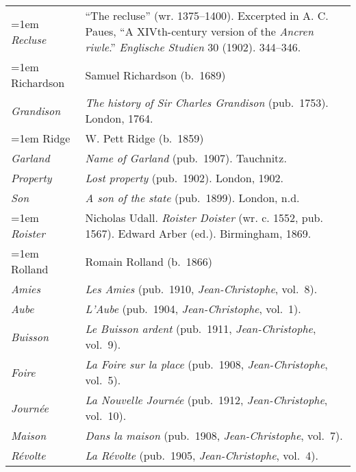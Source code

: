 \begin{xltabular}{\textwidth}{ lQ }
\hangindent=1em  \textit{Recluse} & ``The recluse'' (wr. 1375--1400). Excerpted in A. C. Paues, ``A XIVth-century version of the \textit{Ancren riwle}.'' \textit{Englische Studien} 30 (1902). 344--346. \\ %

\hangindent=1em  Richardson  & Samuel Richardson (b.~1689)\\
\hspace{1em}\textit{Grandison} & \textit{The history of Sir Charles Grandison} (pub.~1753). London, 1764. \\

\hangindent=1em  Ridge & W. Pett Ridge (b.~1859) \\
\hspace{1em}\textit{Garland} & \textit{Name of Garland} (pub.~1907). Tauchnitz. \\
\hspace{1em}\textit{Property} & \textit{Lost property} (pub.~1902). London, 1902. \\
\hspace{1em}\textit{Son} & \textit{A son of the state} (pub.~1899). London, n.d. \\

\hangindent=1em  \textit{Roister} & Nicholas Udall. \textit{Roister Doister} (wr. c. 1552, pub. 1567). Edward Arber (ed.). Birmingham, 1869. \\

\hangindent=1em  Rolland & Romain Rolland (b.~1866) \\
\hspace{1em}\textit{Amies} & \textit{Les Amies} (pub.~1910, \textit{Jean-Christophe}, vol.~8). \\ %
\hspace{1em}\textit{Aube} & \textit{L'Aube} (pub.~1904, \textit{Jean-Christophe}, vol.~1). \\ %
\hspace{1em}\textit{Buisson} & \textit{Le Buisson ardent} (pub.~1911, \textit{Jean-Christophe}, vol.~9). \\ %
\hspace{1em}\textit{Foire} & \textit{La Foire sur la place} (pub.~1908, \textit{Jean-Christophe}, vol.~5). \\ %
\hspace{1em}\textit{Journée} & \textit{La Nouvelle Journée} (pub.~1912, \textit{Jean-Christophe}, vol.~10). \\ %
\hspace{1em}\textit{Maison} & \textit{Dans la maison} (pub.~1908, \textit{Jean-Christophe}, vol.~7). \\ %
\hspace{1em}\textit{Révolte} & \textit{La Révolte} (pub.~1905, \textit{Jean-Christophe}, vol.~4). \\ %


\end{xltabular}
